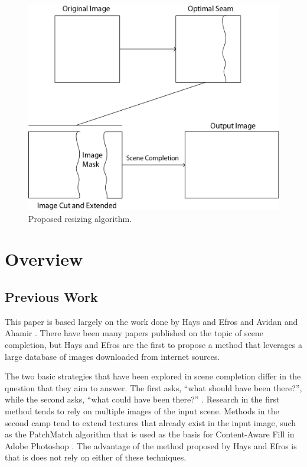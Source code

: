 \documentclass[11pt]{amsart}
\begin{document}
\begin{figure}[htbp]
\begin{center}
\includegraphics[scale=.5]{seamOverview.png}
\caption{Proposed resizing algorithm.}
\label{resize}
\end{center}
\end{figure}

\section{Overview} 
\subsection{Previous Work}
This paper is based largely on the work done by Hays and Efros \cite{Hays:2007} and
Avidan and Ahamir \cite{Avidan:2007}. There have been many papers published on the
topic of scene completion, but Hays and Efros are the first to propose a method that leverages
a large database of images downloaded from internet sources. 

The two basic strategies that have been explored in scene completion differ in the question that
they aim to answer. The first asks, ``what should have been there?'', while the second asks, ``what 
could have been there?'' \cite{Hays:2007}. Research in the first method tends to rely on multiple images of the input scene. Methods in the second camp tend to extend textures that already exist in the input image, such as the PatchMatch algorithm that is used as the basis for Content-Aware Fill in
Adobe Photoshop \cite{Barnes:2009}. The advantage of the method proposed by Hays and Efros is that is does not rely on either of these techniques. 
\end{document}
